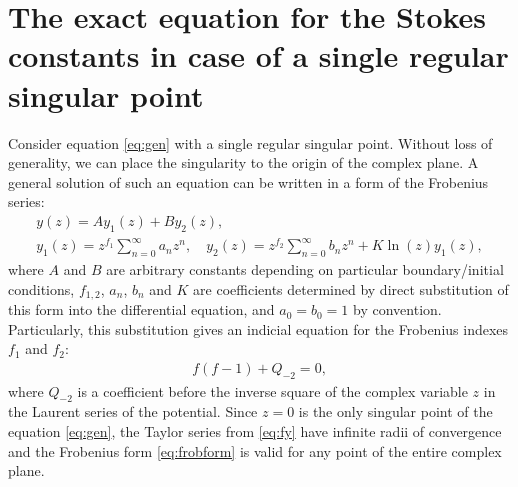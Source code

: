 \documentclass[aip,jmp,reprint]{revtex4-1}
\begin{document}
\section{The exact equation for the Stokes constants in case of a single regular singular point \label{sec:frob}}
Consider equation \eqref{eq:gen} with a single regular singular point. Without loss of generality,
we can place the singularity to the origin of the complex plane. A general solution of such an equation 
can be written in a form of the Frobenius series\cite{cbbook}:
\begin{subequations}
\label{eq:frobform}
\begin{eqnarray}
y(z) = A y_1(z)+B y_2(z), \label{eq:fgensol}
\\
y_1(z) = z^{f_1}\sum_{n=0}^{\infty}{a_n z^n},
\quad
y_2(z) = z^{f_2}\sum_{n=0}^{\infty}{b_n z^n} + K \ln(z) y_1(z), \label{eq:fy}
\end{eqnarray}
\end{subequations}
where $A$ and $B$ are arbitrary constants depending on particular boundary/initial conditions,  
$f_{1,2}$, $a_n$, $b_n$ and $K$ are coefficients determined by direct substitution of this form into the 
differential equation, and $a_0=b_0=1$ by convention. Particularly, this substitution gives
an indicial equation for the Frobenius indexes $f_1$ and $f_2$:
\begin{eqnarray}
f(f-1)+Q_{-2}=0,   \label{eq:indicial}
\end{eqnarray}
where $Q_{-2}$ is a coefficient before the inverse square of the complex variable $z$ in the Laurent series
of the potential. Since $z=0$ is the only singular point of the equation \eqref{eq:gen}, the Taylor 
series from \eqref{eq:fy} have infinite radii of convergence and the
Frobenius form \eqref{eq:frobform} is valid for any point of the entire complex plane.
\end{document}
